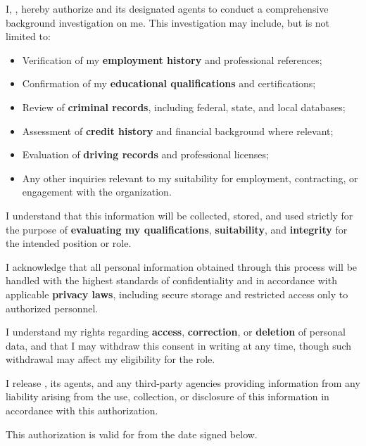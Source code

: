 
I, \senderName{}, hereby authorize \recipientName{} and its designated agents to conduct a comprehensive background investigation on me. This investigation may include, but is not limited to:

\begin{itemize}
  \item Verification of my \textbf{employment history} and professional references;
  \item Confirmation of my \textbf{educational qualifications} and certifications;
  \item Review of \textbf{criminal records}, including federal, state, and local databases;
  \item Assessment of \textbf{credit history} and financial background where relevant;
  \item Evaluation of \textbf{driving records} and professional licenses;
  \item Any other inquiries relevant to my suitability for employment, contracting, or engagement with the organization.
\end{itemize}

\noindent I understand that this information will be collected, stored, and used strictly for the purpose of \textbf{evaluating my qualifications}, \textbf{suitability}, and \textbf{integrity} for the intended position or role. 

\noindent I acknowledge that all personal information obtained through this process will be handled with the highest standards of confidentiality and in accordance with applicable \textbf{privacy laws}, including secure storage and restricted access only to authorized personnel.

I understand my rights regarding \textbf{access}, \textbf{correction}, or \textbf{deletion} of personal data, and that I may withdraw this consent in writing at any time, though such withdrawal may affect my eligibility for the role.

I release \recipientName{}, its agents, and any third-party agencies providing information from any liability arising from the use, collection, or disclosure of this information in accordance with this authorization. 

This authorization is valid for \authorizationDuration{} from the date signed below.


